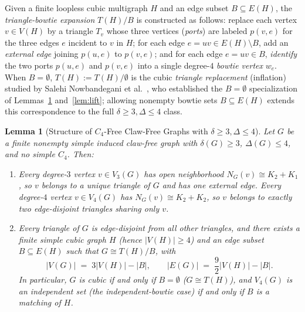\documentclass[11pt,reqno]{amsart}
\theoremstyle{plain}
\newtheorem{lemma}[theorem]{Lemma}
\theoremstyle{definition}
\theoremstyle{remark}
\DeclareRobustCommand{\_}{\ifmmode\text{\textunderscore}\else\textunderscore\allowbreak\fi}
\begin{document}
Given a finite loopless cubic multigraph $H$ and an edge subset $B \subseteq E(H)$, the \emph{triangle-bowtie expansion} $T(H)/B$ is constructed as follows: replace each vertex $v \in V(H)$ by a triangle $T_v$ whose three vertices (\emph{ports}) are labeled $p(v, e)$ for the three edges $e$ incident to $v$ in $H$; for each edge $e = uv \in E(H) \setminus B$, add an \emph{external edge} joining $p(u, e)$ to $p(v, e)$; and for each edge $e = uv \in B$, \emph{identify} the two ports $p(u, e)$ and $p(v, e)$ into a single degree-$4$ \emph{bowtie vertex} $w_e$. When $B = \emptyset$, $T(H) := T(H)/\emptyset$ is the cubic \emph{triangle replacement} (inflation) studied by Salehi Nowbandegani et al.~\cite[Proposition~6 and Corollary~7]{SalehiNowbandegani2014}, who established the $B = \emptyset$ specialization of Lemmas~\ref{lem:repr} and~\ref{lem:lift}; allowing nonempty bowtie sets $B \subseteq E(H)$ extends this correspondence to the full $\delta \ge 3, \Delta \le 4$ class.

\begin{lemma}[Structure of $C_4$-Free Claw-Free Graphs with $\delta \ge 3, \Delta \le 4$]\label{lem:repr}
Let $G$ be a finite nonempty simple induced claw-free graph with $\delta(G) \ge 3$, $\Delta(G) \le 4$, and no simple $C_4$. Then:
\begin{enumerate}[label=(\roman*),leftmargin=2.2em]
  \item Every degree-$3$ vertex $v \in V_3(G)$ has open neighborhood $N_G(v) \cong K_2 + K_1$, so $v$ belongs to a unique triangle of $G$ and has one external edge. Every degree-$4$ vertex $v \in V_4(G)$ has $N_G(v) \cong K_2 + K_2$, so $v$ belongs to exactly two edge-disjoint triangles sharing only $v$.
  \item Every triangle of $G$ is edge-disjoint from all other triangles, and there exists a finite \emph{simple} cubic graph $H$ (hence $|V(H)| \ge 4$) and an edge subset $B \subseteq E(H)$ such that $G \cong T(H)/B$, with
  \[
    |V(G)| \;=\; 3|V(H)| - |B|, \qquad |E(G)| \;=\; \frac{9}{2}|V(H)| - |B|.
  \]
  In particular, $G$ is cubic if and only if $B = \emptyset$ ($G \cong T(H)$), and $V_4(G)$ is an independent set (the \emph{independent-bowtie} case) if and only if $B$ is a matching of $H$.
\end{enumerate}
\end{lemma}
\end{document}
